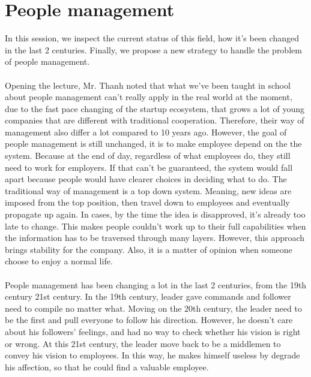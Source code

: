 \documentclass[a4paper, 11pt]{article} %
\begin{document}
\section*{People management}
In this session, we inspect the current status  of this field, how it's been changed in the last 2 centuries. Finally, we propose a new strategy to handle the problem of people management.
\\
\\
Opening the lecture, Mr. Thanh noted that what we've been taught in school about people management can't really apply in the real world at the moment, due to the fast pace changing of the startup ecosystem, that grows a lot of young companies that are different with traditional cooperation. Therefore, their way of management also differ a lot compared to 10 years ago. However, the goal of people management is still unchanged, it is to make employee depend on the the system. Because at the end of day, regardless of what employees do, they still need to work for employers. If that can't be guaranteed, the system would fall apart because people would have clearer choices in deciding what to do. The traditional way of management is a top down system. Meaning, new ideas are imposed from the top position, then travel down to employees and eventually propagate up again. In cases, by the time the idea is disapproved, it's already too late to change. This makes people couldn't work up to their full capabilities when the information has to be traversed through many layers. However, this approach brings stability for the company. Also, it is a matter of opinion when someone choose to enjoy a normal life. 
\\
\\
People management has been changing a lot in the last 2 centuries, from the 19th century 21st    century. In the 19th century, leader gave commands and follower need to compile no matter what. Moving on the 20th century, the leader need to be the first and pull everyone to follow his direction. However, he doesn't care about his followers' feelings, and had no way to check whether his vision is right or wrong. At this 21st century, the leader move back to be a middlemen to convey his vision to employees. In this way, he makes himself useless by degrade his affection, so that he could find a valuable employee.
\\
\\
\end{document}
